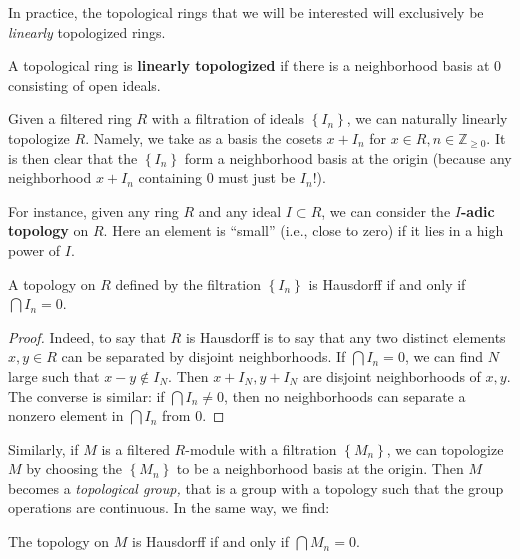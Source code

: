 

In practice, the topological rings that we will be interested will exclusively
be \emph{linearly} topologized rings.

\begin{definition} 
A topological ring is \textbf{linearly topologized} if there is a neighborhood
basis at $0$ consisting of open ideals.
\end{definition} 

Given a filtered ring $R$ with a filtration of ideals $\left\{I_n\right\}$, we
can naturally linearly topologize $R$. Namely, we take as a basis the cosets
$x+I_n$ for $x \in R, n \in \mathbb{Z}_{\geq 0}$. 
It is then clear that the $\left\{I_n\right\}$ form a neighborhood basis at
the origin (because any neighborhood $x+I_n$ containing $0$ must just be
$I_n$!). 

\begin{example} 
For instance, given any ring $R$ and any ideal $I \subset R$, we can consider
the \textbf{$I$-adic topology} on $R$. Here an element is ``small'' (i.e.,
close to zero) if it lies in a high power of $I$.
\end{example} 


\begin{proposition} 
A topology on $R$ defined by the filtration $\left\{I_n\right\}$ is Hausdorff
if and only if $\bigcap I_n = 0$.
\end{proposition} 
\begin{proof} 
Indeed, to say that $R$ is Hausdorff is to say that any two distinct elements
$x,y \in R$ can be separated by disjoint neighborhoods. If $\bigcap I_n = 0$,
we can find $N$ large such that $x -y \notin I_N$. Then $x+I_N, y + I_N$ are
disjoint neighborhoods of $x,y$. 
The converse is similar: if $\bigcap I_n \neq 0$, then no neighborhoods can
separate a nonzero element in $\bigcap I_n$ from $0$.
\end{proof} 

Similarly, if $M$ is a filtered $R$-module with a filtration
$\left\{M_n\right\}$, we can topologize $M$ by choosing the
$\left\{M_n\right\}$ to be a neighborhood basis at the origin.  Then $M$
becomes a \emph{topological group,} that is a group with a topology such that
the group operations are continuous.
In the same way, we find:

\begin{proposition} 
The topology on $M$ is Hausdorff if and only if $\bigcap M_n = 0$.
\end{proposition} 

